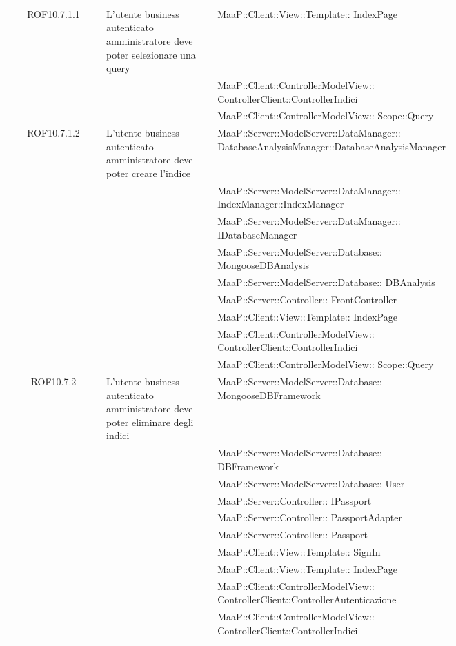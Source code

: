\begin{center}
\begin{longtable}{|c|p{0.25\linewidth}|p{0.5\linewidth}|}
\midrule
ROF10.7.1.1
& L'utente business autenticato amministratore deve poter selezionare una query
& MaaP::Client::View::Template:: IndexPage\\
& & MaaP::Client::ControllerModelView:: ControllerClient::ControllerIndici\\
& & MaaP::Client::ControllerModelView:: Scope::Query\\

\midrule
ROF10.7.1.2
& L'utente business autenticato amministratore deve poter creare l'indice
& MaaP::Server::ModelServer::DataManager:: DatabaseAnalysisManager::DatabaseAnalysisManager\\
& & MaaP::Server::ModelServer::DataManager:: IndexManager::IndexManager\\
& & MaaP::Server::ModelServer::DataManager:: IDatabaseManager\\
& & MaaP::Server::ModelServer::Database:: MongooseDBAnalysis\\
& & MaaP::Server::ModelServer::Database:: DBAnalysis\\
& & MaaP::Server::Controller:: FrontController\\
& & MaaP::Client::View::Template:: IndexPage\\
& & MaaP::Client::ControllerModelView:: ControllerClient::ControllerIndici\\
& & MaaP::Client::ControllerModelView:: Scope::Query\\

\midrule
ROF10.7.2
& L'utente business autenticato amministratore deve poter eliminare degli indici
& MaaP::Server::ModelServer::Database:: MongooseDBFramework\\
& & MaaP::Server::ModelServer::Database:: DBFramework\\
& & MaaP::Server::ModelServer::Database:: User\\
& & MaaP::Server::Controller:: IPassport\\
& & MaaP::Server::Controller:: PassportAdapter\\
& & MaaP::Server::Controller:: Passport\\
& & MaaP::Client::View::Template:: SignIn\\
& & MaaP::Client::View::Template:: IndexPage\\
& & MaaP::Client::ControllerModelView:: ControllerClient::ControllerAutenticazione\\
& & MaaP::Client::ControllerModelView:: ControllerClient::ControllerIndici\\


\end{longtable}
\end{center}

